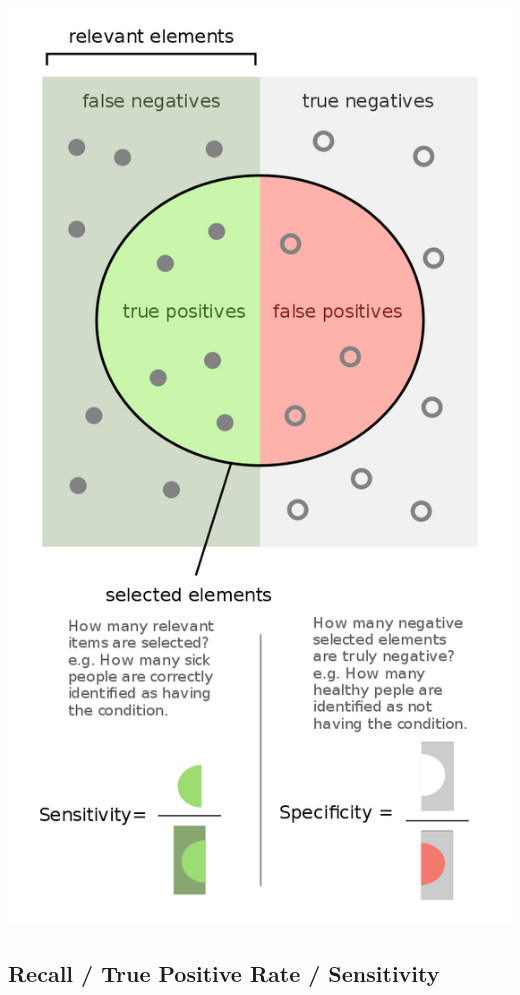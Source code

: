 \begin{multicols}{2}
\begin{center}
\includegraphics[width=\linewidth]{img/640px-Sensitivity-and-specificity.png} 
\end{center}

\subsection{Recall / True Positive Rate / Sensitivity}


\end{multicols}
